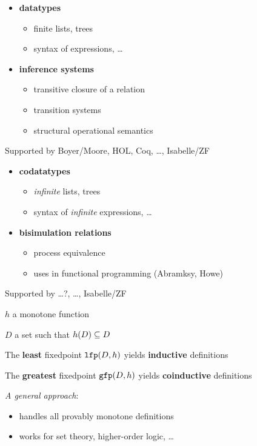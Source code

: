 \begin{slide}
\begin{itemize}
  \item {\bf datatypes}
    \begin{itemize}
      \item finite lists, trees
      \item syntax of expressions, \ldots
    \end{itemize}
  \item {\bf inference systems}
    \begin{itemize}
      \item transitive closure of a relation
      \item transition systems
      \item structural operational semantics
    \end{itemize}
\end{itemize}

Supported by Boyer/Moore, HOL, Coq, \ldots, Isabelle/ZF
\end{slide}


\begin{slide}
\begin{itemize}
  \item {\bf codatatypes}
    \begin{itemize}
      \item {\it infinite\/} lists, trees
      \item  syntax of {\it infinite\/} expressions, \ldots
    \end{itemize}
  \item {\bf bisimulation relations}
    \begin{itemize}
      \item process equivalence
      \item uses in functional programming (Abramksy, Howe)
    \end{itemize}
\end{itemize}

Supported by \ldots ?, \ldots, Isabelle/ZF
\end{slide}


\begin{slide}
$h$ a monotone function

$D$ a set such that $h(D)\subseteq D$

The {\bf least} fixedpoint $\hbox{\tt lfp}(D,h)$ yields {\bf inductive} definitions

The {\bf greatest} fixedpoint $\hbox{\tt gfp}(D,h)$ yields {\bf coinductive} definitions

{\it A general approach\/}:
\begin{itemize}
  \item handles all provably monotone definitions
  \item works for set theory, higher-order logic, \ldots
\end{itemize}
\end{slide}


